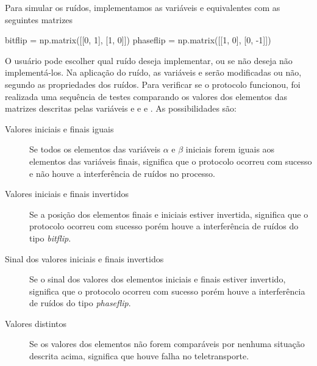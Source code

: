Para simular os ruídos, implementamos as variáveis  e  equivalentes com as seguintes matrizes
\begin{pycode}
  bitflip = np.matrix([[0, 1], [1, 0]])
  phaseflip = np.matrix([[1, 0], [0, -1]])
\end{pycode}
O usuário pode escolher qual ruído deseja implementar, ou se não deseja não implementá-los. Na aplicação do ruído, as variáveis  e  serão modificadas ou não, segundo as propriedades dos ruídos. Para verificar se o protocolo funcionou, foi realizada uma sequência de testes comparando os valores dos elementos das matrizes descritas pelas variáveis  e  e  e . As possibilidades são:
\begin{description}
  \item [Valores iniciais e finais iguais] Se todos os elementos das variáveis $\alpha$ e $\beta$ iniciais forem iguais aos elementos das variáveis finais, significa que o protocolo ocorreu com sucesso e não houve a interferência de ruídos no processo.
  \item [Valores iniciais e finais invertidos] Se a posição dos elementos finais e iniciais estiver invertida, significa que o protocolo ocorreu com sucesso porém houve a interferência de ruídos do tipo \textit{bitflip}.
  \item [Sinal dos valores iniciais e finais invertidos] Se o sinal dos valores dos elementos iniciais e finais estiver invertido, significa que o protocolo ocorreu com sucesso porém houve a interferência de ruídos do tipo \textit{phaseflip}.
  \item [Valores distintos] Se os valores dos elementos não forem comparáveis por nenhuma situação descrita acima, significa que houve falha no teletransporte.
\end{description}

